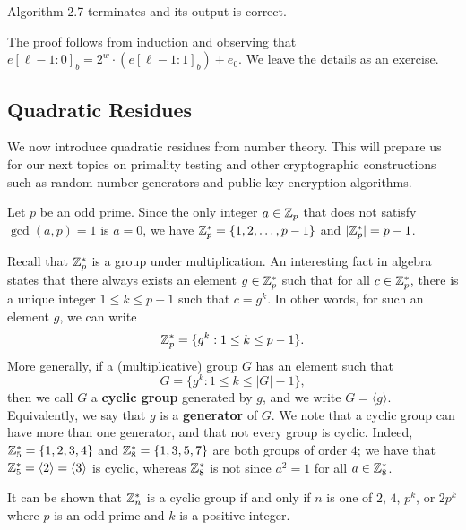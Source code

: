 \newpage
\begin{thm}
Algorithm 2.7 terminates and its output is correct.
\end{thm}
\begin{pf}
The proof follows from induction and observing that $e[\ell-1 : 0]_b = 2^w \cdot (e[\ell-1 : 1]_b) + e_0$. 
We leave the details as an exercise. 
\end{pf}

\subsection{Quadratic Residues}
We now introduce quadratic residues from number theory. This will prepare us for our next 
topics on primality testing and other cryptographic constructions such as random number generators 
and public key encryption algorithms. 

Let $p$ be an odd prime. Since the only integer $a \in \mathbb{Z}_p$ that does not satisfy $\gcd(a, p) = 1$ is 
$a = 0$, we have $\mathbb{Z}_p^* = \{1, 2, \dots, p-1\}$ and $|\mathbb{Z}_p^*| = p-1$. 

Recall that $\mathbb{Z}_p^*$ is a group under multiplication. An interesting fact in algebra states that 
there always exists an element $g \in \mathbb{Z}_p^*$ such that for all $c \in \mathbb{Z}_p^*$, there is a unique 
integer $1 \leq k \leq p-1$ such that $c = g^k$. In other words, for such an element $g$, we can write 
\[ \mathbb{Z}_p^* = \{g^k : 1 \leq k \leq p-1\}. \]
More generally, if a (multiplicative) group $G$ has an element such that 
\[ G = \{g^k : 1 \leq k \leq |G|-1\}, \]
then we call $G$ a {\bf cyclic group} generated by $g$, and we write $G = \langle g \rangle$. 
Equivalently, we say that $g$ is a {\bf generator} of $G$. We note that a cyclic group can 
have more than one generator, and that not every group is cyclic. Indeed, $\mathbb{Z}_5^* = \{1, 2, 3, 4\}$ 
and $\mathbb{Z}_8^* = \{1, 3, 5, 7\}$ are both groups of order $4$; we have that $\mathbb{Z}_5^* = \langle 2 
\rangle = \langle 3 \rangle$ is cyclic, whereas $\mathbb{Z}_8^*$ is not since $a^2 = 1$ for all $a \in \mathbb{Z}_8^*$. 

It can be shown that $\mathbb{Z}_n^*$ is a cyclic group if and only if $n$ is one of $2$, $4$, $p^k$, or 
$2p^k$ where $p$ is an odd prime and $k$ is a positive integer. 

